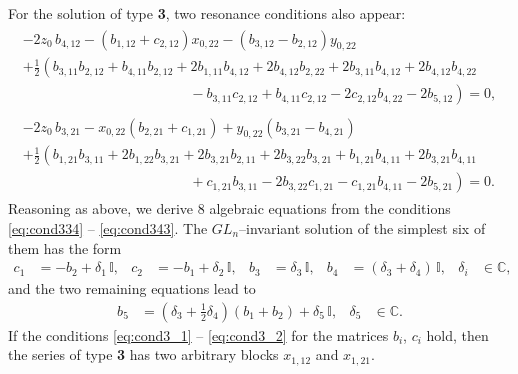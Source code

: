 \documentclass{article}
\theoremstyle{plain}
\newcommand{\brackets}[1]{\left( #1 \right)}
\begin{document}
For the solution of type \textbf{3}, two resonance conditions also appear:
\begin{gather} \label{eq:cond334}
\begin{multlined}
    - 2 z_0 \, b_{4, 12}
    - \brackets{
    b_{1, 12} + c_{2, 12}
    } x_{0, 22}
    - \brackets{
    b_{3, 12} - b_{2, 12}
    } y_{0, 22}
    \\
    + \frac{1}{2} \left(
    b_{3, 11} b_{2, 12}
    + b_{4, 11} b_{2, 12}
    + 2 b_{1, 11} b_{4, 12}
    + 2 b_{4, 12} b_{2, 22}
    + 2 b_{3, 11} b_{4, 12}
    + 2 b_{4, 12} b_{4, 22}
    \right.
    \\
    \left.
    \hspace{5cm}
    - b_{3, 11} c_{2, 12}
    + b_{4, 11} c_{2, 12}
    - 2 c_{2, 12} b_{4, 22}
    - 2 b_{5, 12}
    \right)
    = 0,
\end{multlined}
\\[2mm]
\label{eq:cond343}
\begin{multlined}
    - 2 z_0 \, b_{3, 21}
    - x_{0, 22} \brackets{
    b_{2, 21} + c_{1, 21}
    }
    + y_{0, 22} \brackets{
    b_{3, 21} - b_{4, 21}
    }
    \\
    + \frac{1}{2} \left(
    b_{1, 21} b_{3, 11}
    + 2 b_{1, 22} b_{3, 21}
    + 2 b_{3, 21} b_{2, 11}
    + 2 b_{3, 22} b_{3, 21}
    + b_{1, 21} b_{4, 11}
    + 2 b_{3, 21} b_{4, 11}
    \right.
    \\
    \left.
    \hspace{5cm}
    + c_{1, 21} b_{3, 11}
    - 2 b_{3, 22} c_{1, 21}
    - c_{1, 21} b_{4, 11}
    - 2 b_{5, 21}
    \right)
    = 0.
\end{multlined}
\end{gather}
Reasoning as above, we derive 8 algebraic equations from the conditions \eqref{eq:cond334} -- \eqref{eq:cond343}. The $GL_n$--invariant solution of the simplest six of them has the form
\begin{align} \label{eq:cond3_1}
    c_1
    &= - b_2 + \delta_1 \, \mathbb{I},
    &
    c_2
    &= - b_1 + \delta_2 \, \mathbb{I},
    &
    b_3
    &= \delta_3 \, \mathbb{I},
    &
    b_4
    &= \brackets{\delta_3 + \delta_4} \, \mathbb{I}, 
    &
    \delta_i
    &\in {\mathbb C},
\end{align}
and the two remaining equations lead to  
\begin{align} \label{eq:cond3_2}
    &&
    b_5
    &= \brackets{\delta_3 + \frac{1}{2} \delta_4} \brackets{b_1 + b_2} 
    + \delta_5 \, \mathbb{I}, 
    &
    \delta_5 
    &\in {\mathbb C}.
    &&
\end{align}
If the conditions \eqref{eq:cond3_1} -- \eqref{eq:cond3_2} for the matrices $b_i$, $c_i$ hold, then the series of type \textbf{3} has two arbitrary blocks $x_{1, 12}$ and $x_{1, 21}$.
\end{document}
